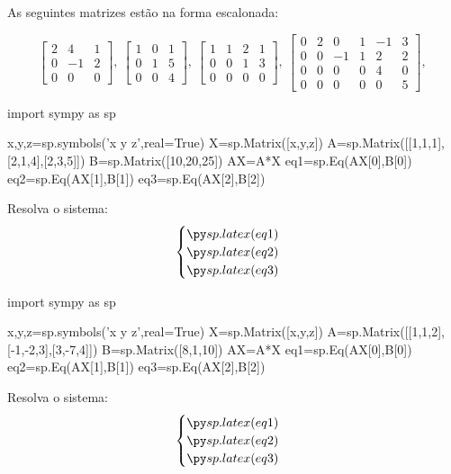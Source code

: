 \begin{frame}[label=sistemas]
As seguintes matrizes estão na forma escalonada:

\[\begin{bmatrix}
2 & 4 & 1\\
0 & -1 & 2 \\
0& 0& 0 
\end{bmatrix},\ 
\begin{bmatrix}
1 & 0 & 1\\
0 & 1 & 5 \\
0& 0& 4 
\end{bmatrix},\ 
\begin{bmatrix}
1 & 1 & 2 & 1\\
0 & 0  & 1 & 3 \\
0& 0& 0 & 0 
\end{bmatrix},\ 
\begin{bmatrix}
0 & 2 & 0 & 1 & -1 & 3\\
0 & 0  & -1 & 1 & 2 & 2 \\
0& 0& 0 & 0 & 4 & 0\\
0 & 0& 0& 0& 0 & 5
\end{bmatrix},\ 
\]

\end{frame}





\begin{frame}[label=sistemas,fragile=singleslide]{ }
\begin{pycode}
import sympy as sp

x,y,z=sp.symbols('x y z',real=True)
X=sp.Matrix([x,y,z])
A=sp.Matrix([[1,1,1],[2,1,4],[2,3,5]])
B=sp.Matrix([10,20,25])
AX=A*X
eq1=sp.Eq(AX[0],B[0])
eq2=sp.Eq(AX[1],B[1])
eq3=sp.Eq(AX[2],B[2])

\end{pycode}

\begin{exe}
Resolva o sistema:
\[\begin{cases}
\pyl{eq1}\\
\pyl{eq2}\\
\pyl{eq3}
\end{cases}\]
\end{exe}

\begin{pycode}
import sympy as sp

x,y,z=sp.symbols('x y z',real=True)
X=sp.Matrix([x,y,z])
A=sp.Matrix([[1,1,2],[-1,-2,3],[3,-7,4]])
B=sp.Matrix([8,1,10])
AX=A*X
eq1=sp.Eq(AX[0],B[0])
eq2=sp.Eq(AX[1],B[1])
eq3=sp.Eq(AX[2],B[2])
\end{pycode}

\begin{exer}
Resolva o sistema:
\[\begin{cases}
\pyl{eq1}\\
\pyl{eq2}\\
\pyl{eq3}
\end{cases}\]
\end{exer}

\end{frame}


